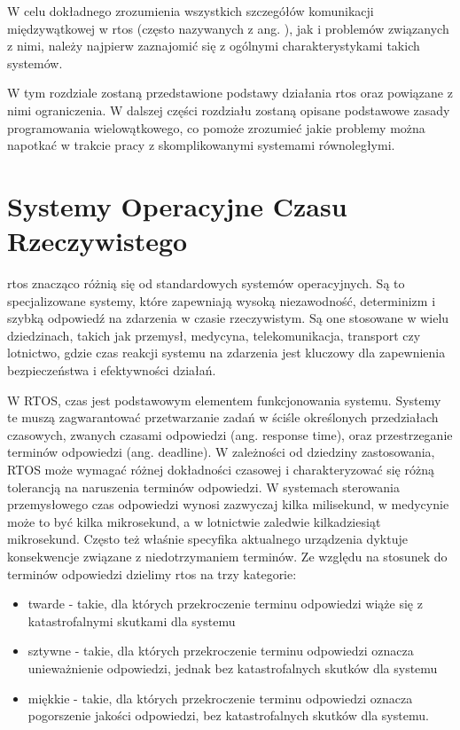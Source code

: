 W celu dokładnego zrozumienia wszystkich szczegółów komunikacji międzywątkowej w \gls{rtos} (często nazywanych z ang. ),
jak i problemów związanych z nimi, należy najpierw zaznajomić się z ogólnymi
charakterystykami takich systemów.

W tym rozdziale zostaną przedstawione podstawy działania \gls{rtos}
oraz powiązane z nimi ograniczenia. W dalszej części rozdziału zostaną opisane podstawowe zasady
programowania wielowątkowego, co pomoże zrozumieć jakie problemy można napotkać w trakcie
pracy z skomplikowanymi systemami równoległymi.

\section{Systemy Operacyjne Czasu Rzeczywistego}
\Gls{rtos} znacząco różnią się od standardowych systemów operacyjnych. Są to specjalizowane systemy, które zapewniają wysoką niezawodność,
determinizm i szybką odpowiedź na zdarzenia w czasie rzeczywistym.
Są one stosowane w wielu dziedzinach, takich jak przemysł, medycyna, telekomunikacja, transport czy lotnictwo,
gdzie czas reakcji systemu na zdarzenia jest kluczowy dla zapewnienia bezpieczeństwa i efektywności działań.

W RTOS, czas jest podstawowym elementem funkcjonowania systemu. Systemy te muszą zagwarantować przetwarzanie zadań w ściśle określonych przedziałach czasowych,
zwanych czasami odpowiedzi (ang. response time), oraz przestrzeganie terminów odpowiedzi (ang. deadline).
W zależności od dziedziny zastosowania, RTOS może wymagać różnej dokładności czasowej i charakteryzować się różną tolerancją na naruszenia terminów odpowiedzi.
W systemach sterowania przemysłowego czas odpowiedzi wynosi zazwyczaj kilka milisekund, w medycynie może to być kilka mikrosekund,
a w lotnictwie zaledwie kilkadziesiąt mikrosekund. Często też właśnie specyfika aktualnego urządzenia dyktuje konsekwencje związane z niedotrzymaniem terminów.
Ze względu na stosunek do terminów odpowiedzi dzielimy \gls{rtos} na trzy kategorie:
\begin{itemize}
    \item twarde - takie, dla których przekroczenie terminu odpowiedzi wiąże się z katastrofalnymi skutkami dla systemu
    \item sztywne - takie, dla których przekroczenie terminu odpowiedzi oznacza unieważnienie odpowiedzi, jednak bez katastrofalnych skutków dla systemu
    \item miękkie - takie, dla których przekroczenie terminu odpowiedzi oznacza pogorszenie jakości odpowiedzi, bez katastrofalnych skutków dla systemu.
\end{itemize}

